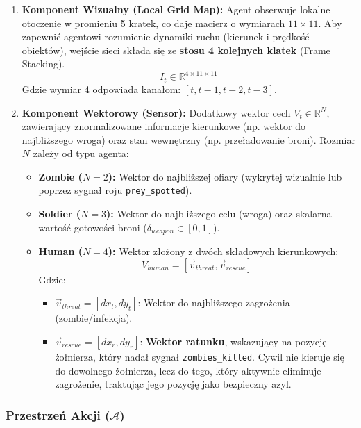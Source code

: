 \documentclass[12pt,a4paper]{article}
\begin{document}
\begin{enumerate}
	\item \textbf{Komponent Wizualny (Local Grid Map):}
	      Agent obserwuje lokalne otoczenie w promieniu 5 kratek, co daje macierz o wymiarach $11 \times 11$. Aby zapewnić agentowi rozumienie dynamiki ruchu (kierunek i prędkość obiektów), wejście sieci składa się ze \textbf{stosu 4 kolejnych klatek} (Frame Stacking).
	      \begin{equation}
		      I_t \in \mathbb{R}^{4 \times 11 \times 11}
	      \end{equation}
	      Gdzie wymiar 4 odpowiada kanałom: $[t, t-1, t-2, t-3]$.

	\item \textbf{Komponent Wektorowy (Sensor):}
	      Dodatkowy wektor cech $V_t \in \mathbb{R}^N$, zawierający znormalizowane informacje kierunkowe (np. wektor do najbliższego wroga) oraz stan wewnętrzny (np. przeładowanie broni). Rozmiar $N$ zależy od typu agenta:
	      \begin{itemize}
		      \item \textbf{Zombie ($N=2$):} Wektor do najbliższej ofiary (wykrytej wizualnie lub poprzez sygnał roju \texttt{prey\_spotted}).
		      \item \textbf{Soldier ($N=3$):} Wektor do najbliższego celu (wroga) oraz skalarna wartość gotowości broni ($\delta_{weapon} \in [0, 1]$).
		      \item \textbf{Human ($N=4$):} Wektor złożony z dwóch składowych kierunkowych:
		            \begin{equation}
			            V_{human} = [\vec{v}_{threat}, \vec{v}_{rescue}]
		            \end{equation}
		            Gdzie:
		            \begin{itemize}
			            \item $\vec{v}_{threat} = [dx_t, dy_t]$: Wektor do najbliższego zagrożenia (zombie/infekcja).
			            \item $\vec{v}_{rescue} = [dx_r, dy_r]$: \textbf{Wektor ratunku}, wskazujący na pozycję żołnierza, który nadał sygnał \texttt{zombies\_killed}. Cywil nie kieruje się do dowolnego żołnierza, lecz do tego, który aktywnie eliminuje zagrożenie, traktując jego pozycję jako bezpieczny azyl.
		            \end{itemize}
	      \end{itemize}
\end{enumerate}

\subsubsection{Przestrzeń Akcji ($\mathcal{A}$)}
\end{document}
